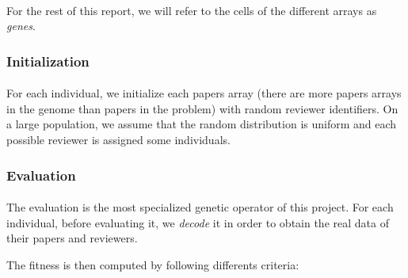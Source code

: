 \documentclass{article}
\begin{document}
      \paragraph{} %
      \label{par:}
        For the rest of this report, we will refer to the cells of the different
        arrays as \textit{genes}.
    
    \subsubsection{Initialization} %
    \label{ssub:initialization}
      
      \paragraph{} %
      \label{par:}
      For each individual, we initialize each papers array (there are more papers
      arrays in the genome than papers in the problem) with random reviewer
      identifiers. On a large population, we assume that the random distribution is
      uniform and each possible reviewer is assigned some individuals. 
      

    \subsubsection{Evaluation} %
    \label{ssub:Evaluation}
      
      \paragraph{} %
      \label{par:}

        The evaluation is the most specialized genetic operator of this project. 
        For each individual, before evaluating it, we \textit{decode} it in
        order to obtain the real data of their papers and reviewers.

        The fitness is then computed by following differents criteria:
        \\
\end{document}
